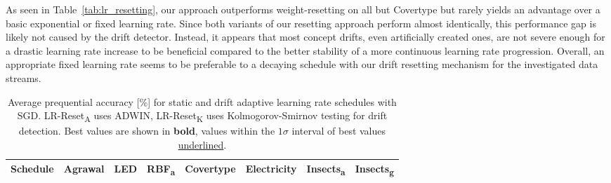 \documentclass{article} %
\begin{document}
As seen in Table~\ref{tab:lr_resetting}, our approach outperforms weight-resetting on all but Covertype but rarely yields an advantage over a basic exponential or fixed learning rate.
Since both variants of our resetting approach perform almost identically, this performance gap is likely not caused by the drift detector.
Instead, it appears that most concept drifts, even artificially created ones, are not severe enough for a drastic learning rate increase to be beneficial compared to the better stability of a more continuous learning rate progression.
Overall, an appropriate fixed learning rate seems to be preferable to a decaying schedule with our drift resetting mechanism for the investigated data streams.

\begin{table}[b]
   \centering
   \small
   \caption{Average prequential accuracy [\%] for static and drift adaptive learning rate schedules with SGD. LR-Reset\textsubscript{A} uses ADWIN, LR-Reset\textsubscript{K} uses Kolmogorov-Smirnov testing for drift detection. Best values are shown in \textbf{bold}, values within the $1\sigma$ interval of best values \underline{underlined}.}
   \begin{tabular}{llllllll}
      \toprule
      Schedule                  & Agrawal                    & LED                      & RBF\textsubscript{a}       & Covertype                  & Electricity                & Insects\textsubscript{a}   & Insects\textsubscript{g}   \\
      \midrule


\end{tabular}
\end{table}
\end{document}
